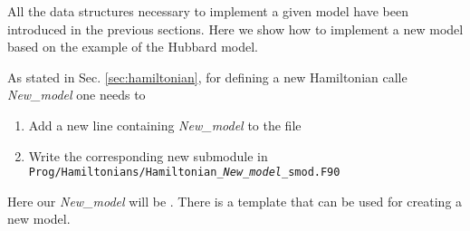 

All the data structures necessary to implement a given model have been introduced in the previous sections. Here we show how to implement a new model based on the example of the Hubbard model.

As stated in Sec. \ref{sec:hamiltonian}, for defining a new Hamiltonian calle \emph{New\_model} one needs to 
\begin{enumerate}
\item Add a new line containing \emph{New\_model} to the file 
\item Write the corresponding new submodule in \texttt{Prog/Hamiltonians/Hamiltonian\_\emph{New\_model}\_smod.F90}
\end{enumerate}
Here our \emph{New\_model} will be . There is a template  that can be used for creating a new model.


